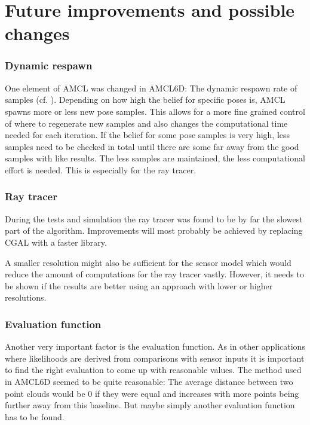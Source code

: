 \documentclass[Thesis.tex]{subfiles}
\begin{document}
\chapter{Future improvements and possible changes}

\subsection*{Dynamic respawn}

One element of \gls{AMCL} was changed in \gls{AMCL6D}: The dynamic respawn rate of samples (cf. \cite{ThrunBurgardFox:2005}). Depending on how high the belief for specific poses is, \gls{AMCL} spawns more or less new pose samples. This allows for a more fine grained control of where to regenerate new samples and also changes the computational time needed for each iteration. If the belief for some pose samples is very high, less samples need to be checked in total until there are some far away from the good samples with like results. The less samples are maintained, the less computational effort is needed. This is especially for the ray tracer.

\subsection*{Ray tracer}

During the tests and simulation the ray tracer was found to be by far the slowest part of the algorithm. Improvements will most probably be achieved by replacing \gls{CGAL} with a faster library.

 A smaller resolution might also be sufficient for the sensor model which would reduce the amount of computations for the ray tracer vastly. However, it needs to be shown if the results are better using an approach with lower or higher resolutions.

\subsection*{Evaluation function}

Another very important factor is the evaluation function. As in other applications where likelihoods are derived from comparisons with sensor inputs it is important to find the right evaluation to come up with reasonable values. The method used in \gls{AMCL6D} seemed to be quite reasonable: The average distance between two point clouds would be 0 if they were equal and increases with more points being further away from this baseline. But maybe simply another evaluation function has to be found. 
\end{document}
